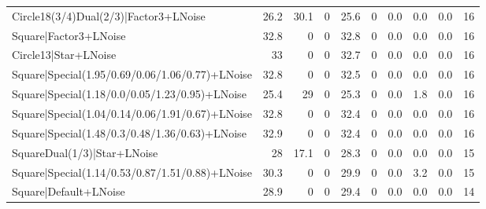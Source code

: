 \begin{tabular}{lrrrrrlllr}
 Circle18(3/4)Dual(2/3)|Factor3+LNoise                           &            26.2 &            30.1 &             0   &            25.6 &            0   & 0.0             & 0.0            & 0.0            &           16 \\
 Square|Factor3+LNoise                                           &            32.8 &             0   &             0   &            32.8 &            0   & 0.0             & 0.0            & 0.0            &           16 \\
 Circle13|Star+LNoise                                            &            33   &             0   &             0   &            32.7 &            0   & 0.0             & 0.0            & 0.0            &           16 \\
 Square|Special(1.95/0.69/0.06/1.06/0.77)+LNoise                 &            32.8 &             0   &             0   &            32.5 &            0   & 0.0             & 0.0            & 0.0            &           16 \\
 Square|Special(1.18/0.0/0.05/1.23/0.95)+LNoise                  &            25.4 &            29   &             0   &            25.3 &            0   & 0.0             & 1.8            & 0.0            &           16 \\
 Square|Special(1.04/0.14/0.06/1.91/0.67)+LNoise                 &            32.8 &             0   &             0   &            32.4 &            0   & 0.0             & 0.0            & 0.0            &           16 \\
 Square|Special(1.48/0.3/0.48/1.36/0.63)+LNoise                  &            32.9 &             0   &             0   &            32.4 &            0   & 0.0             & 0.0            & 0.0            &           16 \\
 SquareDual(1/3)|Star+LNoise                                     &            28   &            17.1 &             0   &            28.3 &            0   & 0.0             & 0.0            & 0.0            &           15 \\
 Square|Special(1.14/0.53/0.87/1.51/0.88)+LNoise                 &            30.3 &             0   &             0   &            29.9 &            0   & 0.0             & 3.2            & 0.0            &           15 \\
 Square|Default+LNoise                                           &            28.9 &             0   &             0   &            29.4 &            0   & 0.0             & 0.0            & 0.0            &           14 \\

\end{tabular}
